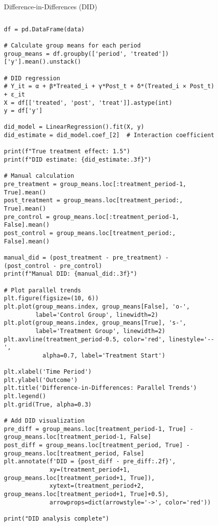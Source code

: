 \documentclass[aspectratio=169,11pt]{beamer}
\begin{document}
\begin{frame}[fragile]{Difference-in-Differences (DID)}
\begin{columns}
\begin{column}{0.55\textwidth}
\begin{lstlisting}[basicstyle=\ttfamily\tiny]
df = pd.DataFrame(data)

# Calculate group means for each period
group_means = df.groupby(['period', 'treated'])['y'].mean().unstack()

# DID regression
# Y_it = α + β*Treated_i + γ*Post_t + δ*(Treated_i × Post_t) + ε_it
X = df[['treated', 'post', 'treat']].astype(int)
y = df['y']

did_model = LinearRegression().fit(X, y)
did_estimate = did_model.coef_[2]  # Interaction coefficient

print(f"True treatment effect: 1.5")
print(f"DID estimate: {did_estimate:.3f}")

# Manual calculation
pre_treatment = group_means.loc[:treatment_period-1, True].mean()
post_treatment = group_means.loc[treatment_period:, True].mean()
pre_control = group_means.loc[:treatment_period-1, False].mean()
post_control = group_means.loc[treatment_period:, False].mean()

manual_did = (post_treatment - pre_treatment) - (post_control - pre_control)
print(f"Manual DID: {manual_did:.3f}")

# Plot parallel trends
plt.figure(figsize=(10, 6))
plt.plot(group_means.index, group_means[False], 'o-', 
         label='Control Group', linewidth=2)
plt.plot(group_means.index, group_means[True], 's-', 
         label='Treatment Group', linewidth=2)
plt.axvline(treatment_period-0.5, color='red', linestyle='--', 
           alpha=0.7, label='Treatment Start')

plt.xlabel('Time Period')
plt.ylabel('Outcome')
plt.title('Difference-in-Differences: Parallel Trends')
plt.legend()
plt.grid(True, alpha=0.3)

# Add DID visualization
pre_diff = group_means.loc[treatment_period-1, True] - group_means.loc[treatment_period-1, False]
post_diff = group_means.loc[treatment_period, True] - group_means.loc[treatment_period, False]
plt.annotate(f'DID = {post_diff - pre_diff:.2f}', 
             xy=(treatment_period+1, group_means.loc[treatment_period+1, True]),
             xytext=(treatment_period+2, group_means.loc[treatment_period+1, True]+0.5),
             arrowprops=dict(arrowstyle='->', color='red'))

print("DID analysis complete")
\end{lstlisting}
\end{column}
\begin{column}{0.45\textwidth}
\begin{figure}
\centering
{}
\end{figure}
\end{column}
\end{columns}
\end{frame}
\end{document}
